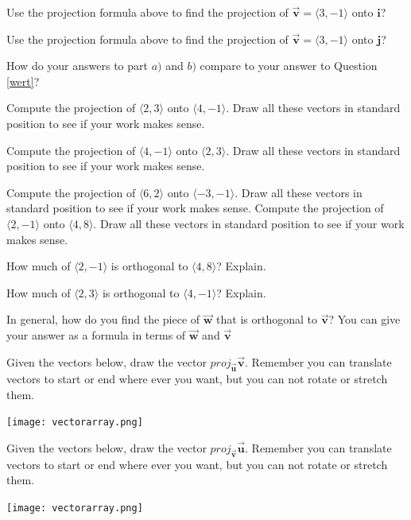 \bq \be
\item Use the projection formula above to find the projection of $\vec{\textbf{v}}=\langle 3,-1\rangle$ onto $\textbf{i}$?
\item Use the projection formula above to find the projection of $\vec{\textbf{v}}=\langle 3,-1\rangle$ onto $\textbf{j}$?
\item How do your answers to part $a)$ and $b)$ compare to your answer to Question \ref{wert}?
\ee \eq

\bq Compute the projection of $\langle 2,3\rangle$ onto $\langle 4,-1\rangle$. Draw all these vectors in standard position to see if your work makes sense.
\eq

\bq Compute the projection of $\langle 4,-1\rangle$ onto $\langle 2,3\rangle$. Draw all these vectors in standard position to see if your work makes sense.
\eq

\bq Compute the projection of $\langle 6,2\rangle$ onto $\langle -3,-1\rangle$. Draw all these vectors in standard position to see if your work makes sense.
\eq
\bq Compute the projection of $\langle 2,-1\rangle$ onto $\langle 4,8\rangle$. Draw all these vectors in standard position to see if your work makes sense.
\eq

\bq How much of $\langle 2,-1\rangle$ is orthogonal to $\langle 4,8\rangle$? Explain.
\eq

\bq How much of $\langle 2,3\rangle$ is orthogonal to $\langle 4,-1\rangle$? Explain.
\eq

\bq In general, how do you find the piece of $\vec{\textbf{w}}$ that is orthogonal to $\vec{\textbf{v}}$? You can give your answer as a formula in terms of $\vec{\textbf{w}}$ and $\vec{\textbf{v}}$
\eq

\bq Given the vectors below, draw the vector $proj_{\vec{\textbf{u}}} \vec{\textbf{v}}$. Remember you can translate vectors to start or end where ever you want, but you can not rotate or stretch them.

\begin{center} \texttt{[image: vectorarray.png]} \end{center}
\eq
\bq Given the vectors below, draw the vector $proj_{\vec{\textbf{v}}} \vec{\textbf{u}}$. Remember you can translate vectors to start or end where ever you want, but you can not rotate or stretch them.

\begin{center} \texttt{[image: vectorarray.png]} \end{center}
\eq


